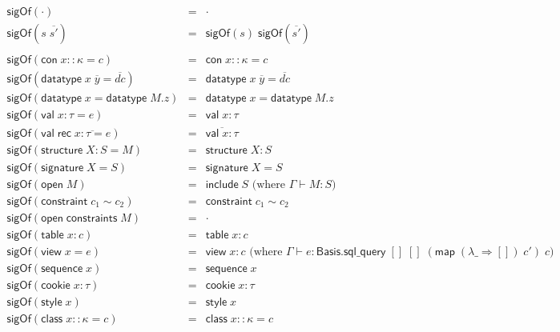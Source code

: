 \documentclass{article}
\newcommand{\mt}[1]{\mathsf{#1}}
\begin{document}
\begin{eqnarray*}
  \mt{sigOf}(\cdot) &=& \cdot \\
  \mt{sigOf}(s \; \overline{s'}) &=& \mt{sigOf}(s) \; \mt{sigOf}(\overline{s'}) \\
  \\
  \mt{sigOf}(\mt{con} \; x :: \kappa = c) &=& \mt{con} \; x :: \kappa = c \\
  \mt{sigOf}(\mt{datatype} \; x \; \overline{y} = \overline{dc}) &=& \mt{datatype} \; x \; \overline{y} = \overline{dc} \\
  \mt{sigOf}(\mt{datatype} \; x = \mt{datatype} \; M.z) &=& \mt{datatype} \; x = \mt{datatype} \; M.z \\
  \mt{sigOf}(\mt{val} \; x : \tau = e) &=& \mt{val} \; x : \tau \\
  \mt{sigOf}(\mt{val} \; \mt{rec} \; \overline{x : \tau = e}) &=& \overline{\mt{val} \; x : \tau} \\
  \mt{sigOf}(\mt{structure} \; X : S = M) &=& \mt{structure} \; X : S \\
  \mt{sigOf}(\mt{signature} \; X = S) &=& \mt{signature} \; X = S \\
  \mt{sigOf}(\mt{open} \; M) &=& \mt{include} \; S \textrm{ (where $\Gamma \vdash M : S$)} \\
  \mt{sigOf}(\mt{constraint} \; c_1 \sim c_2) &=& \mt{constraint} \; c_1 \sim c_2 \\
  \mt{sigOf}(\mt{open} \; \mt{constraints} \; M) &=& \cdot \\
  \mt{sigOf}(\mt{table} \; x : c) &=& \mt{table} \; x : c \\
  \mt{sigOf}(\mt{view} \; x = e) &=& \mt{view} \; x : c \textrm{ (where $\Gamma \vdash e : \mt{Basis}.\mt{sql\_query} \; [] \; [] \; (\mt{map} \; (\lambda \_ \Rightarrow []) \; c') \; c$)} \\
  \mt{sigOf}(\mt{sequence} \; x) &=& \mt{sequence} \; x \\
  \mt{sigOf}(\mt{cookie} \; x : \tau) &=& \mt{cookie} \; x : \tau \\
  \mt{sigOf}(\mt{style} \; x) &=& \mt{style} \; x \\
  \mt{sigOf}(\mt{class} \; x :: \kappa = c) &=& \mt{class} \; x :: \kappa = c \\
\end{eqnarray*}
\end{document}
